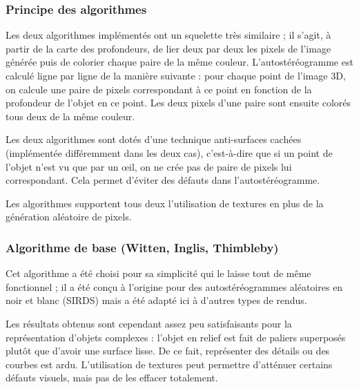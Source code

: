 
        \subsubsection{Principe des algorithmes}

  Les deux algorithmes implémentés ont un squelette très similaire ; il s'agit, à partir de la carte des profondeurs, de lier deux par deux les pixels de l'image générée puis de colorier chaque paire de la même couleur. L'autostéréogramme est calculé ligne par ligne de la manière suivante : pour chaque point de l'image 3D, on calcule une paire de pixels correspondant à ce point en fonction de la profondeur de l'objet en ce point. Les deux pixels d'une paire sont ensuite colorés tous deux de la même couleur. 

  Les deux algorithmes sont dotés d'une technique anti-surfaces cachées (implémentée différemment dans les deux cas), c'est-à-dire que si un point de l'objet n'est vu que par un \oe il, on ne crée pas de paire de pixels lui correspondant. Cela permet d'éviter des défauts dans l'autostéréogramme.

  Les algorithmes supportent tous deux l'utilisation de textures en plus de la génération aléatoire de pixels. 
  
  \subsubsection{Algorithme de base (Witten, Inglis, Thimbleby)}

  Cet algorithme a été choisi pour sa simplicité qui le laisse tout de même fonctionnel ; il a été conçu à l'origine pour des autostéréogrammes aléatoires en noir et blanc (SIRDS) mais a été adapté ici à d'autres types de rendus.

  Les résultats obtenus sont cependant assez peu satisfaisants pour la représentation d'objets complexes : l'objet en relief est fait de paliers superposés plutôt que d'avoir une surface lisse. De ce fait, représenter des détails ou des courbes est ardu. L'utilisation de textures peut permettre d'atténuer certains défauts visuels, mais pas de les effacer totalement.

